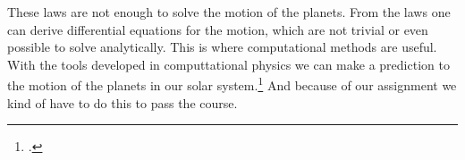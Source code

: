 These laws are not enough to solve the motion of the planets. From the laws one can derive differential equations for the motion, which are not trivial or even possible to solve analytically. This is where computational methods are useful. With the tools developed in computtational physics we can make a prediction to the motion of the planets in our solar system.\footnote{\href{http://www.uio.no/studier/emner/matnat/fys/FYS3150/h17/index.html}{\color{blue}{Semester page for FYS3150 - Autumn 2017}}.} And because of our assignment we kind of have to do this to pass the course.\cite{project4}
